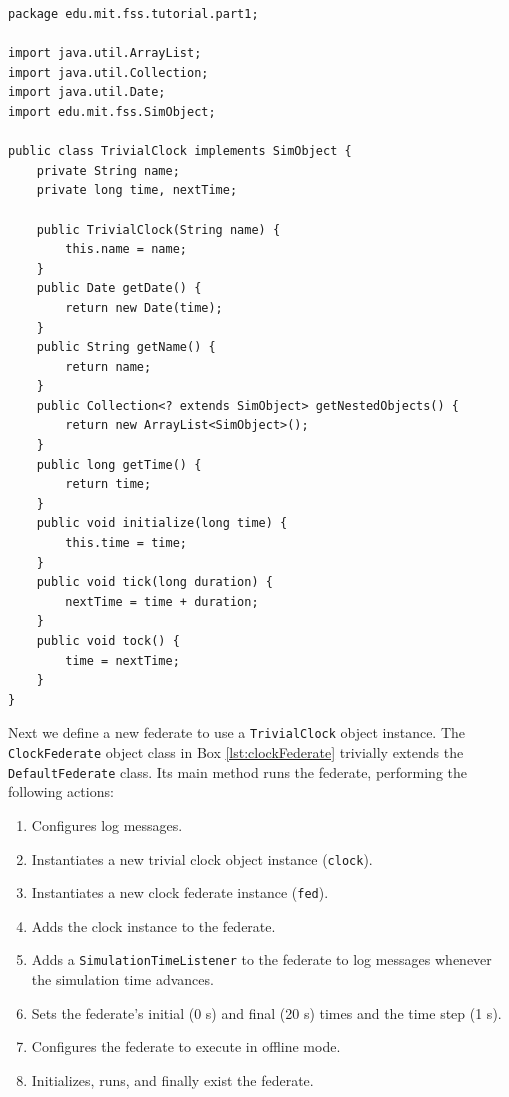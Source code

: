 \documentclass[]{article}
\begin{document}
\begin{Code}
\begin{lstlisting}[caption={TrivialClock object class},label={lst:trivialClock}]
package edu.mit.fss.tutorial.part1;

import java.util.ArrayList;
import java.util.Collection;
import java.util.Date;
import edu.mit.fss.SimObject;

public class TrivialClock implements SimObject {
	private String name;
	private long time, nextTime;
	
	public TrivialClock(String name) {
		this.name = name;
	}
	public Date getDate() {
		return new Date(time);
	}
	public String getName() {
		return name;
	}
	public Collection<? extends SimObject> getNestedObjects() {
		return new ArrayList<SimObject>();
	}
	public long getTime() {
		return time;
	}
	public void initialize(long time) {
		this.time = time;
	}
	public void tick(long duration) {
		nextTime = time + duration;
	}
	public void tock() {
		time = nextTime;
	}
}
\end{lstlisting}
\end{Code}

Next we define a new federate to use a \texttt{TrivialClock} object instance. The \texttt{ClockFederate} object class in Box \ref{lst:clockFederate} trivially extends the \texttt{DefaultFederate} class. Its main method runs the federate, performing the following actions:
\begin{enumerate}
\item Configures log messages.
\item Instantiates a new trivial clock object instance (\texttt{clock}).
\item Instantiates a new clock federate instance (\texttt{fed}).
\item Adds the clock instance to the federate.
\item Adds a \texttt{SimulationTimeListener} to the federate to log messages whenever the simulation time advances.
\item Sets the federate's initial (0 s) and final (20 s) times and the time step (1 s).
\item Configures the federate to execute in offline mode.
\item Initializes, runs, and finally exist the federate.
\end{enumerate}
\end{document}
